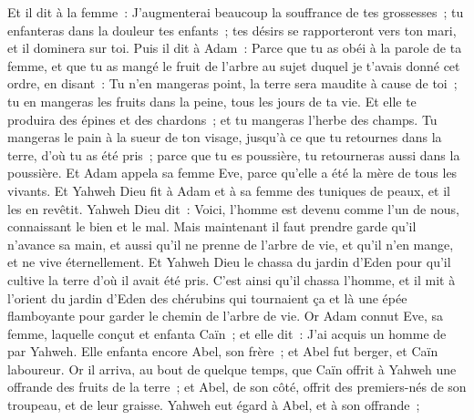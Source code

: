 \begin{multicols}{2}
Et il dit à la femme~: J'augmenterai beaucoup la souffrance de tes grossesses~; tu enfanteras dans la douleur tes enfants~; tes désirs se rapporteront vers ton mari, et il dominera sur toi.
Puis il dit à Adam~: Parce que tu as obéi à la parole de ta femme, et que tu as mangé le fruit de l'arbre au sujet duquel je t'avais donné cet ordre, en disant~: Tu n'en mangeras point, la terre sera maudite à cause de toi~; tu en mangeras les fruits dans la peine, tous les jours de ta vie.
Et elle te produira des épines et des chardons~; et tu mangeras l'herbe des champs.
Tu mangeras le pain à la sueur de ton visage, jusqu'à ce que tu retournes dans la terre, d'où tu as été pris~; parce que tu es poussière, tu retourneras aussi dans la poussière. 
Et Adam appela sa femme Eve, parce qu'elle a été la mère de tous les vivants.
Et Yahweh Dieu fit à Adam et à sa femme des tuniques de peaux, et il les en revêtit.
Yahweh Dieu dit~: Voici, l'homme est devenu comme l'un de nous, connaissant le bien et le mal. Mais maintenant il faut prendre garde qu'il n'avance sa main, et aussi qu'il ne prenne de l'arbre de vie, et qu'il n'en mange, et ne vive éternellement.
Et Yahweh Dieu le chassa du jardin d'Eden pour qu'il cultive la terre d'où il avait été pris.
C'est ainsi qu'il chassa l'homme, et il mit à l'orient du jardin d'Eden des chérubins qui tournaient ça et là une épée flamboyante pour garder le chemin de l'arbre de vie.
\VerseOne{}Or Adam connut Eve, sa femme, laquelle conçut et enfanta Caïn~; et elle dit~: J'ai acquis un homme de par Yahweh.
Elle enfanta encore Abel, son frère~; et Abel fut berger, et Caïn laboureur.
Or il arriva, au bout de quelque temps, que Caïn offrit à Yahweh une offrande des fruits de la terre~;
et Abel, de son côté, offrit des premiers-nés de son troupeau, et de leur graisse. Yahweh eut égard à Abel, et à son offrande~;

\end{multicols}
